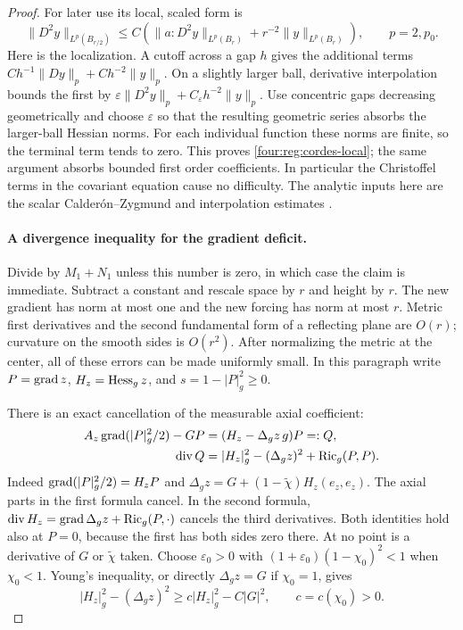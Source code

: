 \begin{proof}
For later use its local, scaled form is
\begin{equation}\label{four:reg:cordes-local}
 \|D^2y\|_{L^p(B_{r/2})}
 \le C\left(\|a:D^2y\|_{L^p(B_r)}
                  +r^{-2}\|y\|_{L^p(B_r)}\right),
 \qquad p=2,p_0.
\end{equation}
Here is the localization.  A cutoff across a gap $h$ gives the
additional terms $Ch^{-1}\|Dy\|_p+Ch^{-2}\|y\|_p$.
On a slightly larger ball, derivative interpolation bounds the first
by $\varepsilon\|D^2y\|_p+C_\varepsilon h^{-2}\|y\|_p$.
Use concentric gaps decreasing geometrically and choose
$\varepsilon$ so that the resulting geometric series absorbs the
larger-ball Hessian norms.  For each individual function these norms
are finite, so the terminal term tends to zero.  This proves
\eqref{four:reg:cordes-local}; the same argument absorbs bounded first
order coefficients.  In particular the Christoffel terms in the
covariant equation cause no difficulty.  The analytic inputs here
are the scalar Calder\'on--Zygmund and interpolation estimates
\cite{GilbargTrudinger2001}.

\paragraph{A divergence inequality for the gradient deficit.}
Divide by $M_1+N_1$ unless this number is zero, in which case the
claim is immediate.  Subtract a constant and rescale space by $r$
and height by $r$.  The new gradient has norm at most one and the
new forcing has norm at most $r$.  Metric first derivatives and the
second fundamental form of a reflecting plane are $O(r)$;
curvature on the smooth sides is $O(r^2)$.  After normalizing the
metric at the center, all of these errors can be made uniformly
small.  In this paragraph write
$P=\operatorname{grad} z$, $H_z=\operatorname{Hess}_g z$, and $s=1-|P|_g^2\ge0$.

There is an exact cancellation of the measurable axial coefficient:
\begin{align}
 A_z\operatorname{grad}(|P|_g^2/2)-GP
   &=(H_z-\Delta_gz\,g)P=:Q,\label{four:reg:flux-identity}\\
 \operatorname{div} Q
   &=|H_z|_g^2-(\Delta_gz)^2+\operatorname{Ric}_g(P,P).
                                      \label{four:reg:flux-divergence}
\end{align}
Indeed $\operatorname{grad}(|P|_g^2/2)=H_zP$ and
$\Delta_gz=G+(1-\widetilde\chi)H_z(e_z,e_z)$.  The axial parts
in the first formula cancel.  In the second formula,
$\operatorname{div} H_z=\operatorname{grad}\Delta_gz+\operatorname{Ric}_g(P,\cdot)$ cancels the third
derivatives.  Both identities hold also at $P=0$, because the first
has both sides zero there.  At no point is a derivative of
$G$ or $\widetilde\chi$ taken.
Choose $\varepsilon_0>0$ with
$(1+\varepsilon_0)(1-\chi_0)^2<1$ when $\chi_0<1$.
Young's inequality, or directly $\Delta_gz=G$ if $\chi_0=1$, gives
\begin{equation}\label{four:reg:flux-coercivity}
 |H_z|_g^2-(\Delta_gz)^2
       \ge c|H_z|_g^2-C|G|^2,
 \qquad c=c(\chi_0)>0.
\end{equation}


\end{proof}

